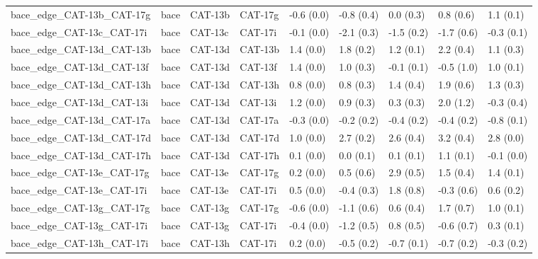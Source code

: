 \begin{tabular}{lllllllll}
bace\_edge\_CAT-13b\_CAT-17g        &      bace &     CAT-13b &     CAT-17g &  -0.6 (0.0) &        -0.8 (0.4) &   0.0 (0.3) &   0.8 (0.6) &   1.1 (0.1) \\
bace\_edge\_CAT-13c\_CAT-17i        &      bace &     CAT-13c &     CAT-17i &  -0.1 (0.0) &        -2.1 (0.3) &  -1.5 (0.2) &  -1.7 (0.6) &  -0.3 (0.1) \\
bace\_edge\_CAT-13d\_CAT-13b        &      bace &     CAT-13d &     CAT-13b &   1.4 (0.0) &         1.8 (0.2) &   1.2 (0.1) &   2.2 (0.4) &   1.1 (0.3) \\
bace\_edge\_CAT-13d\_CAT-13f        &      bace &     CAT-13d &     CAT-13f &   1.4 (0.0) &         1.0 (0.3) &  -0.1 (0.1) &  -0.5 (1.0) &   1.0 (0.1) \\
bace\_edge\_CAT-13d\_CAT-13h        &      bace &     CAT-13d &     CAT-13h &   0.8 (0.0) &         0.8 (0.3) &   1.4 (0.4) &   1.9 (0.6) &   1.3 (0.3) \\
bace\_edge\_CAT-13d\_CAT-13i        &      bace &     CAT-13d &     CAT-13i &   1.2 (0.0) &         0.9 (0.3) &   0.3 (0.3) &   2.0 (1.2) &  -0.3 (0.4) \\
bace\_edge\_CAT-13d\_CAT-17a        &      bace &     CAT-13d &     CAT-17a &  -0.3 (0.0) &        -0.2 (0.2) &  -0.4 (0.2) &  -0.4 (0.2) &  -0.8 (0.1) \\
bace\_edge\_CAT-13d\_CAT-17d        &      bace &     CAT-13d &     CAT-17d &   1.0 (0.0) &         2.7 (0.2) &   2.6 (0.4) &   3.2 (0.4) &   2.8 (0.0) \\
bace\_edge\_CAT-13d\_CAT-17h        &      bace &     CAT-13d &     CAT-17h &   0.1 (0.0) &         0.0 (0.1) &   0.1 (0.1) &   1.1 (0.1) &  -0.1 (0.0) \\
bace\_edge\_CAT-13e\_CAT-17g        &      bace &     CAT-13e &     CAT-17g &   0.2 (0.0) &         0.5 (0.6) &   2.9 (0.5) &   1.5 (0.4) &   1.4 (0.1) \\
bace\_edge\_CAT-13e\_CAT-17i        &      bace &     CAT-13e &     CAT-17i &   0.5 (0.0) &        -0.4 (0.3) &   1.8 (0.8) &  -0.3 (0.6) &   0.6 (0.2) \\
bace\_edge\_CAT-13g\_CAT-17g        &      bace &     CAT-13g &     CAT-17g &  -0.6 (0.0) &        -1.1 (0.6) &   0.6 (0.4) &   1.7 (0.7) &   1.0 (0.1) \\
bace\_edge\_CAT-13g\_CAT-17i        &      bace &     CAT-13g &     CAT-17i &  -0.4 (0.0) &        -1.2 (0.5) &   0.8 (0.5) &  -0.6 (0.7) &   0.3 (0.1) \\
bace\_edge\_CAT-13h\_CAT-17i        &      bace &     CAT-13h &     CAT-17i &   0.2 (0.0) &        -0.5 (0.2) &  -0.7 (0.1) &  -0.7 (0.2) &  -0.3 (0.2) \\

\end{tabular}
